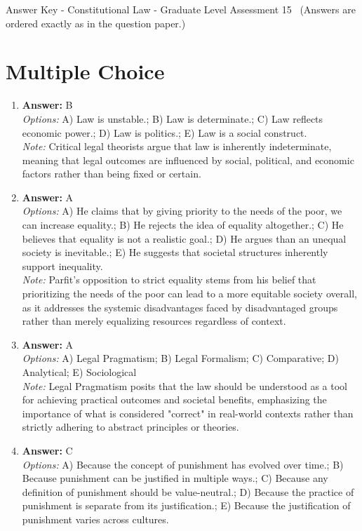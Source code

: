 \documentclass[12pt]{article}
\begin{document}
\begin{center}
Answer Key - Constitutional Law - Graduate Level Assessment 15 \
\small (Answers are ordered exactly as in the question paper.)
\end{center}

\section*{Multiple Choice}
\begin{enumerate}[label=\arabic*.]
\item \textbf{Answer:} B
\\ \textit{Options:} A) Law is unstable.; B) Law is determinate.; C) Law reflects economic power.; D) Law is politics.; E) Law is a social construct.
\\ \textit{Note:} Critical legal theorists argue that law is inherently indeterminate, meaning that legal outcomes are influenced by social, political, and economic factors rather than being fixed or certain.
\item \textbf{Answer:} A
\\ \textit{Options:} A) He claims that by giving priority to the needs of the poor, we can increase equality.; B) He rejects the idea of equality altogether.; C) He believes that equality is not a realistic goal.; D) He argues than an unequal society is inevitable.; E) He suggests that societal structures inherently support inequality.
\\ \textit{Note:} Parfit's opposition to strict equality stems from his belief that prioritizing the needs of the poor can lead to a more equitable society overall, as it addresses the systemic disadvantages faced by disadvantaged groups rather than merely equalizing resources regardless of context.
\item \textbf{Answer:} A
\\ \textit{Options:} A) Legal Pragmatism; B) Legal Formalism; C) Comparative; D) Analytical; E) Sociological
\\ \textit{Note:} Legal Pragmatism posits that the law should be understood as a tool for achieving practical outcomes and societal benefits, emphasizing the importance of what is considered "correct" in real-world contexts rather than strictly adhering to abstract principles or theories.
\item \textbf{Answer:} C
\\ \textit{Options:} A) Because the concept of punishment has evolved over time.; B) Because punishment can be justified in multiple ways.; C) Because any definition of punishment should be value-neutral.; D) Because the practice of punishment is separate from its justification.; E) Because the justification of punishment varies across cultures.

\end{enumerate}
\end{document}
